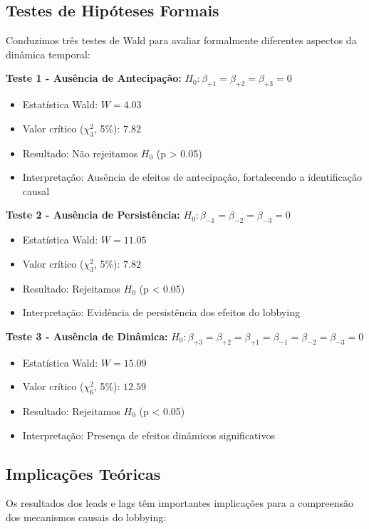 \subsection{Testes de Hipóteses Formais}

Conduzimos três testes de Wald para avaliar formalmente diferentes aspectos da dinâmica temporal:

\textbf{Teste 1 - Ausência de Antecipação:} $H_0: \beta_{+1} = \beta_{+2} = \beta_{+3} = 0$
\begin{itemize}
    \item Estatística Wald: $W = 4.03$
    \item Valor crítico ($\chi^2_3$, 5\%): $7.82$
    \item Resultado: Não rejeitamos $H_0$ (p > 0.05)
    \item Interpretação: Ausência de efeitos de antecipação, fortalecendo a identificação causal
\end{itemize}

\textbf{Teste 2 - Ausência de Persistência:} $H_0: \beta_{-1} = \beta_{-2} = \beta_{-3} = 0$
\begin{itemize}
    \item Estatística Wald: $W = 11.05$
    \item Valor crítico ($\chi^2_3$, 5\%): $7.82$ 
    \item Resultado: Rejeitamos $H_0$ (p < 0.05)
    \item Interpretação: Evidência de persistência dos efeitos do lobbying
\end{itemize}

\textbf{Teste 3 - Ausência de Dinâmica:} $H_0: \beta_{+3} = \beta_{+2} = \beta_{+1} = \beta_{-1} = \beta_{-2} = \beta_{-3} = 0$
\begin{itemize}
    \item Estatística Wald: $W = 15.09$
    \item Valor crítico ($\chi^2_6$, 5\%): $12.59$
    \item Resultado: Rejeitamos $H_0$ (p < 0.05)
    \item Interpretação: Presença de efeitos dinâmicos significativos
\end{itemize}

\subsection{Implicações Teóricas}

Os resultados dos leads e lags têm importantes implicações para a compreensão dos mecanismos causais do lobbying:

